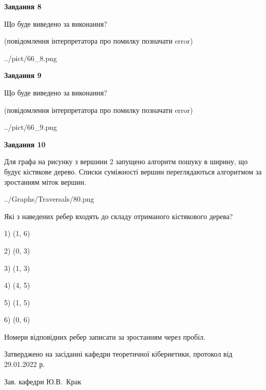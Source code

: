 \documentclass[12pt, ukrainian]{article}
\begin{document}
{\begin {large}
{\begin {center}\textbf{Завдання 8}\end {center}}\par
Що буде виведено за виконання?\par
 (повідомлення інтерпретатора про помилку позначати error)
\begin{center}
	{../pict/66_8.png}
\end{center}
\newpage

{\begin {center}\textbf{Завдання 9}\end {center}}\par
Що буде виведено за виконання?\par
 (повідомлення інтерпретатора про помилку позначати error)\par
\begin{center}
	{../pict/66_9.png}
\end{center}
\newpage

{\begin {center}\textbf{Завдання 10}\end {center}}\par
Для графа на рисунку з вершини 2 запущено алгоритм пошуку в ширину, що будує кістякове дерево. Списки суміжності вершин переглядаються алгоритмом за зростанням міток вершин.\par
\begin{center}
	{../Graphs/Traversals/80.png}
\end{center}
\par Які з наведених ребер входять до складу отриманого кістякового дерева?\par
1) (1, 6)\par
2) (0, 3)\par
3) (1, 3)\par
4) (4, 5)\par
5) (1, 5)\par
6) (0, 6)\par
{\vskip 15pt} Номери відповідних ребер записати за зростанням через пробіл.\par
\newpage


\end {large}
}
{\smallskip \begin {small} Затверджено на засіданні кафедри теоретичної кібернетики, протокол  від   29.01.2022 р.\par\smallskip\smallskip
{\parbox {6.5 cm}{Зав. кафедри \dotfill Ю.В.~Крак}} \end{small}}
\end{document}

